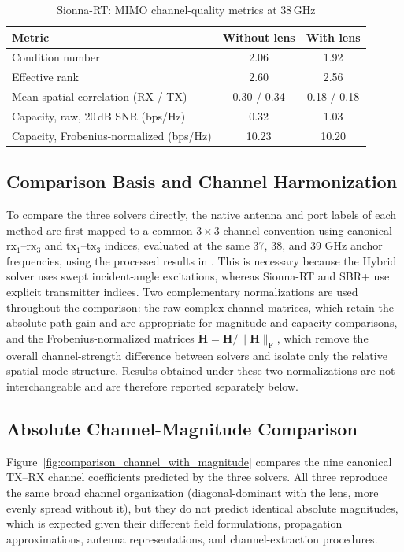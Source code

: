 \begin{table}[h!]
    \begin{center}
        \caption{Sionna-RT: MIMO channel-quality metrics at 38\,GHz}
        \label{table:sionna_metrics}
        \begin{tabular}{|l|c|c|}
            \hline
            \textbf{Metric} & \textbf{Without lens} & \textbf{With lens} \\
            \hline
            Condition number & 2.06 & 1.92 \\
            Effective rank & 2.60 & 2.56 \\
            Mean spatial correlation (RX / TX) & 0.30 / 0.34 & 0.18 / 0.18 \\
            Capacity, raw, 20\,dB SNR (bps/Hz) & 0.32 & 1.03 \\
            Capacity, Frobenius-normalized (bps/Hz) & 10.23 & 10.20 \\
            \hline
        \end{tabular}
    \end{center}
\end{table}

\subsection{Comparison Basis and Channel Harmonization}
To compare the three solvers directly, the native antenna and port labels of each method are first mapped to a common $3\times3$ channel convention using canonical $\mathrm{rx}_1$--$\mathrm{rx}_3$ and $\mathrm{tx}_1$--$\mathrm{tx}_3$ indices, evaluated at the same 37, 38, and 39 GHz anchor frequencies, using the processed results in . This is necessary because the Hybrid solver uses swept incident-angle excitations, whereas Sionna-RT and SBR+ use explicit transmitter indices. Two complementary normalizations are used throughout the comparison: the raw complex channel matrices, which retain the absolute path gain and are appropriate for magnitude and capacity comparisons, and the Frobenius-normalized matrices $\widetilde{\mathbf{H}}=\mathbf{H}/\lVert\mathbf{H}\rVert_{\mathrm{F}}$, which remove the overall channel-strength difference between solvers and isolate only the relative spatial-mode structure. Results obtained under these two normalizations are not interchangeable and are therefore reported separately below.

\subsection{Absolute Channel-Magnitude Comparison}
Figure~\ref{fig:comparison_channel_with_magnitude} compares the nine canonical TX--RX channel coefficients predicted by the three solvers. All three reproduce the same broad channel organization (diagonal-dominant with the lens, more evenly spread without it), but they do not predict identical absolute magnitudes, which is expected given their different field formulations, propagation approximations, antenna representations, and channel-extraction procedures.

